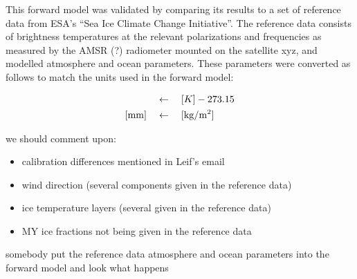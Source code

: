 \documentclass[11pt, a4paper]{article}
\begin{document}
This forward model was validated by comparing its results to a set of reference data from ESA's ``Sea Ice Climate Change Initiative''. The reference data consists of brightness temperatures at the relevant polarizations and frequencies as measured by the AMSR (?) radiometer mounted on the satellite xyz, and modelled atmosphere and ocean parameters. These parameters were converted as follows to match the units used in the forward model:

\begin{align*}
[^\circ C] \quad & \leftarrow \quad [K] - 273.15 \\
[\text{\SI{}{mm}}] \quad & \leftarrow \quad [\text{\SI{}{kg/m^2}}]
\end{align*}



we should comment upon:
\begin{itemize}
\item calibration differences mentioned in Leif's email
\item wind direction (several components given in the reference data)
\item ice temperature layers (several given in the reference data)
\item MY ice fractions not being given in the reference data
\end{itemize}

somebody put the reference data atmosphere and ocean parameters into the forward model and look what happens
\end{document}
